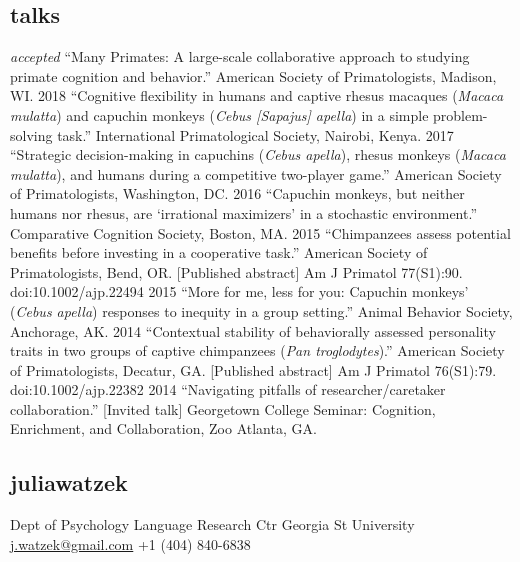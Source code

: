 \documentclass[]{friggeri-cv}
\begin{document}

\subsection{talks}

\begin{entrylist2}
  \entrytwo
    {\emph{accepted}}
    {``Many Primates: A large-scale collaborative approach to studying primate cognition and behavior.'' American Society of Primatologists, Madison, WI.}
  \entrytwo
    {2018}
    {``Cognitive flexibility in humans and captive rhesus macaques (\emph{Macaca mulatta}) and capuchin monkeys (\emph{Cebus [Sapajus] apella}) in a simple problem-solving task.'' International Primatological Society, Nairobi, Kenya.}
  \entrytwo
    {2017}
    {``Strategic decision-making in capuchins (\emph{Cebus apella}), rhesus monkeys (\emph{Macaca mulatta}), and humans during a competitive two-player game.'' American Society of Primatologists, Washington, DC.}
  \entrytwo
    {2016}
    {``Capuchin monkeys, but neither humans nor rhesus, are `irrational maximizers' in a stochastic environment.'' Comparative Cognition Society, Boston, MA.}
  \entrytwo
    {2015}
    {``Chimpanzees assess potential benefits before investing in a cooperative task.'' American Society of Primatologists, Bend, OR. [Published abstract] Am J Primatol 77(S1):90. doi:10.1002/ajp.22494}
  \entrytwo
    {2015}
    {``More for me, less for you: Capuchin monkeys' (\emph{Cebus apella}) responses to inequity in a group setting.'' Animal Behavior Society, Anchorage, AK.}
  \entrytwo
    {2014}
    {``Contextual stability of behaviorally assessed personality traits in two groups of captive chimpanzees (\emph{Pan troglodytes}).'' American Society of Primatologists, Decatur, GA. [Published abstract] Am J Primatol 76(S1):79. doi:10.1002/ajp.22382}
  \entrytwo
    {2014}
    {``Navigating pitfalls of researcher/caretaker collaboration.'' [Invited talk] Georgetown College Seminar: Cognition, Enrichment, and Collaboration, Zoo Atlanta, GA.}
\end{entrylist2}

\begin{aside}
  \section{{\normalfont julia}watzek}
    Dept of Psychology
    Language Research Ctr
    Georgia St University
    ~
    \href{mailto:j.watzek@gmail.com}{j.watzek@gmail.com}
    +1 (404) 840-6838
\end{aside}
\end{document}
